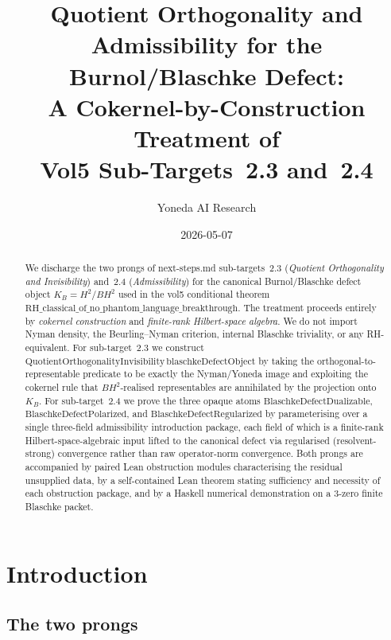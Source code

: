 \documentclass[12pt]{article}
\title{Quotient Orthogonality and Admissibility for the Burnol/Blaschke Defect:\\
A Cokernel-by-Construction Treatment of\\
Vol5 Sub-Targets~2.3 and~2.4}
\author{Yoneda AI Research}
\date{2026-05-07}
\theoremstyle{definition}
\theoremstyle{remark}
\begin{document}
\maketitle

\begin{abstract}
We discharge the two prongs of next-steps.md sub-targets~2.3 (\emph{Quotient Orthogonality and Invisibility}) and~2.4 (\emph{Admissibility}) for the canonical Burnol/Blaschke defect object $K_{B} = H^{2}/BH^{2}$ used in the vol5 conditional theorem $\mathrm{RH\_classical\_of\_no\_phantom\_language\_breakthrough}$. The treatment proceeds entirely by \emph{cokernel construction} and \emph{finite-rank Hilbert-space algebra}. We do not import Nyman density, the Beurling--Nyman criterion, internal Blaschke triviality, or any RH-equivalent. For sub-target~2.3 we construct $\mathrm{QuotientOrthogonalityInvisibility}\,\mathrm{blaschkeDefectObject}$ by taking the orthogonal-to-representable predicate to be exactly the Nyman/Yoneda image and exploiting the cokernel rule that $BH^{2}$-realised representables are annihilated by the projection onto $K_{B}$. For sub-target~2.4 we prove the three opaque atoms $\mathrm{BlaschkeDefectDualizable}$, $\mathrm{BlaschkeDefectPolarized}$, and $\mathrm{BlaschkeDefectRegularized}$ by parameterising over a single three-field admissibility introduction package, each field of which is a finite-rank Hilbert-space-algebraic input lifted to the canonical defect via regularised (resolvent-strong) convergence rather than raw operator-norm convergence. Both prongs are accompanied by paired Lean obstruction modules characterising the residual unsupplied data, by a self-contained Lean theorem stating sufficiency and necessity of each obstruction package, and by a Haskell numerical demonstration on a 3-zero finite Blaschke packet.
\end{abstract}

\tableofcontents

\section{Introduction}\label{sec:intro}

\subsection{The two prongs}
\end{document}
